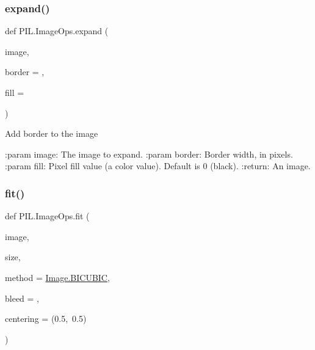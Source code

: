 \subsubsection{\texorpdfstring{expand()}{expand()}}
{\footnotesize\ttfamily def P\+I\+L.\+Image\+Ops.\+expand (\begin{DoxyParamCaption}\item[{}]{image,  }\item[{}]{border = {},  }\item[{}]{fill = {} }\end{DoxyParamCaption})}

\begin{DoxyVerb}Add border to the image

:param image: The image to expand.
:param border: Border width, in pixels.
:param fill: Pixel fill value (a color value).  Default is 0 (black).
:return: An image.
\end{DoxyVerb}
 \mbox{\label{namespacePIL_1_1ImageOps_a335558444f171870d2a9ab53c1aab5b9}} 
\subsubsection{\texorpdfstring{fit()}{fit()}}
{\footnotesize\ttfamily def P\+I\+L.\+Image\+Ops.\+fit (\begin{DoxyParamCaption}\item[{}]{image,  }\item[{}]{size,  }\item[{}]{method = {\ttfamily \hyperlink{namespacePIL_1_1Image_a3824ac5a0532aa60f7072af889d88e59}{Image.\+B\+I\+C\+U\+B\+IC}},  }\item[{}]{bleed = {},  }\item[{}]{centering = {\ttfamily (0.5,~0.5)} }\end{DoxyParamCaption})}

